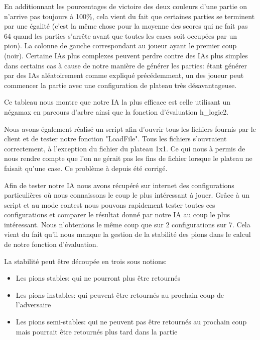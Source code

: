 \documentclass[12pt]{article}
\begin{document}
En additionnant les pourcentages de victoire des deux couleurs d'une partie on n'arrive pas toujours à 100\%, cela vient du fait que certaines parties se terminent par une égalité (c'est la même chose pour la moyenne des scores qui ne fait pas 64 quand les parties s’arrête avant que toutes les cases soit occupées par un pion). La colonne de gauche correspondant au joueur ayant le premier coup (noir). Certaine IAs plus complexes peuvent perdre contre des IAs plus simples dans certains cas à cause de notre manière de générer les parties: étant générer par des IAs aléatoirement comme expliqué précédemment, un des joueur peut commencer la partie avec une configuration de plateau très désavantageuse.

Ce tableau nous montre que notre IA la plus efficace est celle utilisant un négamax en parcours d'arbre ainsi que la fonction d'évaluation h\_logic2.

\bigbreak


Nous avons également réalisé un script afin d'ouvrir tous les fichiers fournis par le client et de tester notre fonction "LoadFile". Tous les fichiers s'ouvraient correctement, à l'exception du fichier du plateau 1x1. Ce qui nous à permis de nous rendre compte que l'on ne gérait pas les fins de fichier lorsque le plateau ne faisait qu'une case. Ce problème à depuis été corrigé.

Afin de tester notre IA nous avons récupéré sur internet des configurations particulières où nous connaissons le coup le plus intéressant à jouer. Grâce à un script et au mode contest nous pouvons rapidement tester toutes ces configurations et comparer le résultat donné par notre IA au coup le plus intéressant. Nous n'obtenions le même coup que sur 2 configurations sur 7. Cela vient du fait qu'il nous manque la gestion de la stabilité des pions dans le calcul de notre fonction d'évaluation.

La stabilité peut être découpée en trois sous notions:
\begin{itemize}
\item Les pions stables: qui ne pourront plus être retournés
\item Les pions instables: qui peuvent être retournés au prochain coup de l'adversaire
\item Les pions semi-stables: qui ne peuvent pas être retournés au prochain coup mais pourrait être retournés plus tard dans la partie
\end{itemize}
\end{document}
